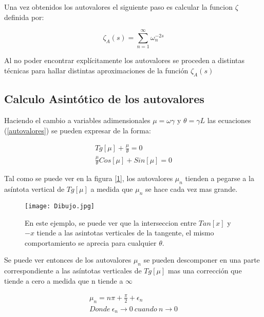 Una vez obtenidos los autovalores el siguiente paso es calcular la funcion $\zeta$ definida por:

\begin{equation}
    \zeta _ {A } (s) = \sum_{n = 1} ^{ \infty } \omega _n ^ {-2 s}
\end{equation}

Al no poder encontrar explícitamente los autovalores se proceden a distintas técnicas para hallar distintas aproximaciones de la función $\zeta _A (s)$

\subsection{Calculo Asintótico de los autovalores}


Haciendo el cambio a variables adimensionales $\mu = \omega \gamma $ y $\theta = \gamma L $ las ecuaciones (\ref{autovalores}) se pueden expresar de la forma:

\begin{equation}
\begin{array}{c}
    Tg[\mu] + \frac{\mu}{\theta} = 0 \\
    \frac{\mu}{\theta} Cos[\mu] + Sin[\mu] = 0
\end{array}
\label{eq.asintota}
\end{equation}

Tal como se puede ver en la figura [\ref{fig:Dibujo}], los autovalores $\mu _n$ tienden a pegarse a la asíntota vertical de $ Tg [ \mu ] $ a medida que $\mu _n$ se hace cada vez mas grande.

\begin{figure}
    \centering
    \texttt{[image: Dibujo.jpg]}
    \caption{En este ejemplo, se puede ver que la interseccion entre $Tan[x]$ y $-x$ tiende a las asintotas verticales de la tangente, el mismo comportamiento se aprecia para cualquier $ \theta $.}
    \label{fig:Dibujo}
\end{figure}

Se puede ver entonces de los autovalores $\mu _n$ se pueden descomponer en una parte correspondiente a las asíntotas verticales de $Tg[\mu]$ mas una corrección que tiende a cero a medida que n tiende a $\infty$

\begin{equation}
\begin{array}{c}
    \mu _n = n \pi + \frac{\pi}{2} + \epsilon _n \\
    Donde \ \epsilon _n \rightarrow{0}  \ cuando \ n \rightarrow{0}
\end{array}
\label{eq.mu}
\end{equation}


